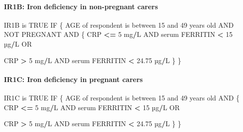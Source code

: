 \documentclass[12pt,a4paper]{article}
\newenvironment{Shaded}{\begin{snugshade}}{\end{snugshade}}
\newcommand{\DecValTok}[1]{\textcolor[rgb]{0.00,0.00,0.81}{#1}}
\newcommand{\FloatTok}[1]{\textcolor[rgb]{0.00,0.00,0.81}{#1}}
\newcommand{\NormalTok}[1]{#1}
\newcommand{\OperatorTok}[1]{\textcolor[rgb]{0.81,0.36,0.00}{\textbf{#1}}}
\newcommand{\OtherTok}[1]{\textcolor[rgb]{0.56,0.35,0.01}{#1}}
\newcommand{\StringTok}[1]{\textcolor[rgb]{0.31,0.60,0.02}{#1}}
\let\oldparagraph\paragraph
\renewcommand{\paragraph}[1]{\oldparagraph{#1}\mbox{}}
\begin{document}
\hypertarget{ir1b-iron-deficiency-in-non-pregnant-carers}{%
\paragraph{IR1B: Iron deficiency in non-pregnant carers}\label{ir1b-iron-deficiency-in-non-pregnant-carers}}

\begin{Shaded}
\begin{Highlighting}[]
\NormalTok{IR1B is }\OtherTok{TRUE}\NormalTok{ IF}
\NormalTok{  \{}
\NormalTok{    AGE of respondent is between }\DecValTok{15}\NormalTok{ and }\DecValTok{49}\NormalTok{ years old AND NOT PREGNANT AND}
\NormalTok{      \{}
\NormalTok{        CRP }\OperatorTok{<=}\StringTok{ }\DecValTok{5}\NormalTok{ mg}\OperatorTok{/}\NormalTok{L AND serum FERRITIN }\OperatorTok{<}\StringTok{ }\DecValTok{15}\NormalTok{ µg}\OperatorTok{/}\NormalTok{L OR}
     
\NormalTok{        CRP }\OperatorTok{>}\StringTok{ }\DecValTok{5}\NormalTok{ mg}\OperatorTok{/}\NormalTok{L AND serum FERRITIN }\OperatorTok{<}\StringTok{ }\FloatTok{24.75}\NormalTok{ µg}\OperatorTok{/}\NormalTok{L}
\NormalTok{      \}}
\NormalTok{  \}}
\end{Highlighting}
\end{Shaded}

\hypertarget{ir1c-iron-deficiency-in-pregnant-carers}{%
\paragraph{IR1C: Iron deficiency in pregnant carers}\label{ir1c-iron-deficiency-in-pregnant-carers}}

\begin{Shaded}
\begin{Highlighting}[]
\NormalTok{IR1C is }\OtherTok{TRUE}\NormalTok{ IF}
\NormalTok{  \{}
\NormalTok{    AGE of respondent is between }\DecValTok{15}\NormalTok{ and }\DecValTok{49}\NormalTok{ years old AND}
\NormalTok{    \{}
\NormalTok{      CRP }\OperatorTok{<=}\StringTok{ }\DecValTok{5}\NormalTok{ mg}\OperatorTok{/}\NormalTok{L AND serum FERRITIN }\OperatorTok{<}\StringTok{ }\DecValTok{15}\NormalTok{ µg}\OperatorTok{/}\NormalTok{L OR}
     
\NormalTok{      CRP }\OperatorTok{>}\StringTok{ }\DecValTok{5}\NormalTok{ mg}\OperatorTok{/}\NormalTok{L AND serum FERRITIN }\OperatorTok{<}\StringTok{ }\FloatTok{24.75}\NormalTok{ µg}\OperatorTok{/}\NormalTok{L}
\NormalTok{    \}}
\NormalTok{  \}}
\end{Highlighting}
\end{Shaded}
\end{document}
